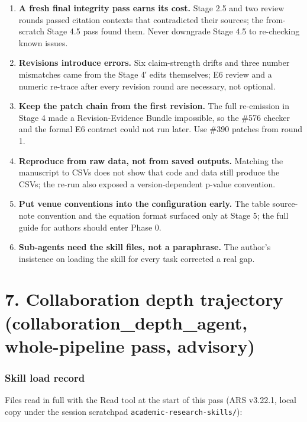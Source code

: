 \documentclass[12pt,a4paper]{article}
\providecommand{\tightlist}{\setlength{\itemsep}{0pt}\setlength{\parskip}{0pt}}
\begin{document}
\begin{enumerate}
\def\labelenumi{\arabic{enumi}.}
\tightlist
\item
  \textbf{A fresh final integrity pass earns its cost.} Stage 2.5 and
  two review rounds passed citation contexts that contradicted their
  sources; the from-scratch Stage 4.5 pass found them. Never downgrade
  Stage 4.5 to re-checking known issues.
\item
  \textbf{Revisions introduce errors.} Six claim-strength drifts and
  three number mismatches came from the Stage 4′ edits themselves; E6
  review and a numeric re-trace after every revision round are
  necessary, not optional.
\item
  \textbf{Keep the patch chain from the first revision.} The full
  re-emission in Stage 4 made a Revision-Evidence Bundle impossible, so
  the \#576 checker and the formal E6 contract could not run later. Use
  \#390 patches from round 1.
\item
  \textbf{Reproduce from raw data, not from saved outputs.} Matching the
  manuscript to CSVs does not show that code and data still produce the
  CSVs; the re-run also exposed a version-dependent p-value convention.
\item
  \textbf{Put venue conventions into the configuration early.} The table
  source-note convention and the equation format surfaced only at Stage
  5; the full guide for authors should enter Phase 0.
\item
  \textbf{Sub-agents need the skill files, not a paraphrase.} The
  author's insistence on loading the skill for every task corrected a
  real gap.
\end{enumerate}

\hypertarget{collaboration-depth-trajectory-collaboration_depth_agent-whole-pipeline-pass-advisory}{%
\section{7. Collaboration depth trajectory (collaboration\_depth\_agent,
whole-pipeline pass,
advisory)}\label{collaboration-depth-trajectory-collaboration_depth_agent-whole-pipeline-pass-advisory}}

\hypertarget{skill-load-record}{%
\subsubsection{Skill load record}\label{skill-load-record}}

Files read in full with the Read tool at the start of this pass (ARS
v3.22.1, local copy under the session scratchpad
\texttt{academic-research-skills/}):
\end{document}
